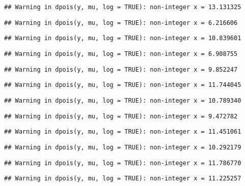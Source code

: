 \documentclass[
]{article}
\begin{document}
\begin{verbatim}
## Warning in dpois(y, mu, log = TRUE): non-integer x = 13.131325
\end{verbatim}

\begin{verbatim}
## Warning in dpois(y, mu, log = TRUE): non-integer x = 6.216606
\end{verbatim}

\begin{verbatim}
## Warning in dpois(y, mu, log = TRUE): non-integer x = 10.839601
\end{verbatim}

\begin{verbatim}
## Warning in dpois(y, mu, log = TRUE): non-integer x = 6.908755
\end{verbatim}

\begin{verbatim}
## Warning in dpois(y, mu, log = TRUE): non-integer x = 9.852247
\end{verbatim}

\begin{verbatim}
## Warning in dpois(y, mu, log = TRUE): non-integer x = 11.744045
\end{verbatim}

\begin{verbatim}
## Warning in dpois(y, mu, log = TRUE): non-integer x = 10.789340
\end{verbatim}

\begin{verbatim}
## Warning in dpois(y, mu, log = TRUE): non-integer x = 9.472782
\end{verbatim}

\begin{verbatim}
## Warning in dpois(y, mu, log = TRUE): non-integer x = 11.451061
\end{verbatim}

\begin{verbatim}
## Warning in dpois(y, mu, log = TRUE): non-integer x = 10.292179
\end{verbatim}

\begin{verbatim}
## Warning in dpois(y, mu, log = TRUE): non-integer x = 11.786770
\end{verbatim}

\begin{verbatim}
## Warning in dpois(y, mu, log = TRUE): non-integer x = 11.225257
\end{verbatim}
\end{document}
